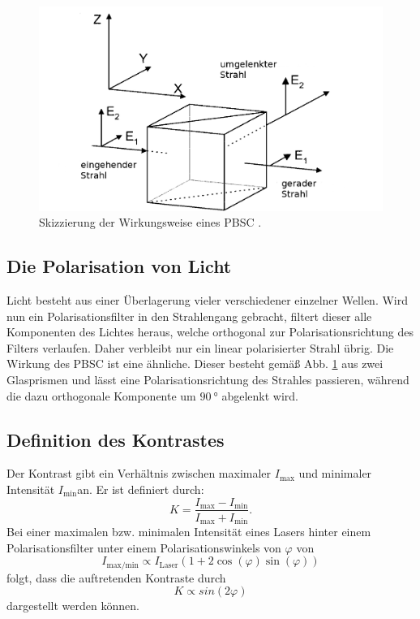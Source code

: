 \begin{figure}
	\centering
	\includegraphics[width=\linewidth-100pt,height=\textheight-100pt,keepaspectratio]{content/Bilder/PBSC.png}
	\caption{Skizzierung der Wirkungsweise eines PBSC \cite{V64}.}
	\label{fig:PBSC}
\end{figure}


\subsection{Die Polarisation von Licht}
Licht besteht aus einer Überlagerung vieler verschiedener einzelner Wellen. Wird nun ein Polarisationsfilter in den Strahlengang gebracht, filtert dieser alle Komponenten des Lichtes heraus, welche orthogonal zur Polarisationsrichtung des Filters verlaufen. Daher verbleibt nur ein linear polarisierter Strahl übrig. Die Wirkung des PBSC ist eine ähnliche. Dieser besteht gemäß Abb. \ref{fig:PBSC} aus zwei Glasprismen und lässt eine Polarisationsrichtung des Strahles passieren, während die dazu orthogonale Komponente um $\SI{90}{\degree}$ abgelenkt wird.

\subsection{Definition des Kontrastes}
Der Kontrast gibt ein Verhältnis zwischen maximaler $I_\text{max}$ und minimaler Intensität $I_\text{min}$an. Er ist definiert durch:
\begin{equation}
    K = \frac{I_\text{max} - I_\text{min}}{I_\text{max} + I_\text{min}} \text{.}          \label{eq:kont}
\end{equation}
Bei einer maximalen bzw. minimalen Intensität eines Lasers hinter einem Polarisationsfilter unter einem Polarisationswinkels von $\varphi$ von
\begin{equation}
	I_\text{max/min} \propto I_\text{Laser} \left(  1+ 2 \cos(\varphi) \sin(\varphi) \right) \label{eq:I}
\end{equation}
folgt, dass die auftretenden Kontraste durch
\begin{equation}
	K \propto sin(2 \varphi) \label{eq:kontrast}
\end{equation}
dargestellt werden können.